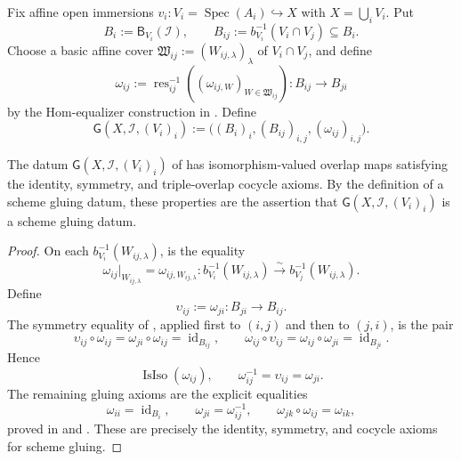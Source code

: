 \begin{definition}
  \label{def:nagata-global-blowup-glue-data}

  Fix affine open immersions
  $v_i\colon V_i=\operatorname{Spec}(A_i)\hookrightarrow X$ with
  $X=\bigcup_iV_i$.  Put
  \[
    B_i:=\mathsf B_{V_i}(\mathcal I),\qquad
    B_{ij}:=b_{V_i}^{-1}(V_i\cap V_j)\subseteq B_i.
  \]
  Choose a basic affine cover
  $\mathfrak W_{ij}:=(W_{ij,\lambda})_\lambda$ of $V_i\cap V_j$, and define
  \[
    \omega_{ij}:=
      \operatorname{res}_{ij}^{-1}
      ((\widehat\omega_{ij,W})_{W\in\mathfrak W_{ij}})
      \colon B_{ij}\longrightarrow B_{ji}
  \]
  by the Hom-equalizer construction in
  .
  Define
  \[
    \mathsf G(X,\mathcal I,(V_i)_i):=
      \bigl((B_i)_i,(B_{ij})_{i,j},(\omega_{ij})_{i,j}\bigr).
  \]
\end{definition}

\begin{lemma}
  \label{lemma:nagata-global-blowup-glue-data-valid}

  The datum $\mathsf G(X,\mathcal I,(V_i)_i)$ of
   has isomorphism-valued
  overlap maps satisfying the identity, symmetry, and triple-overlap cocycle
  axioms.  By the definition of a scheme gluing datum, these properties are
  the assertion that $\mathsf G(X,\mathcal I,(V_i)_i)$ is a scheme gluing
  datum.
\end{lemma}

\begin{proof}
  On each $b_{V_i}^{-1}(W_{ij,\lambda})$,
   is the equality
  \[
    \omega_{ij}|_{W_{ij,\lambda}}
      =\omega_{ij,W_{ij,\lambda}}\colon
      b_{V_i}^{-1}(W_{ij,\lambda})
      \xrightarrow{\sim}b_{V_j}^{-1}(W_{ij,\lambda}).
  \]
  Define
  \[
    \upsilon_{ij}:=\omega_{ji}\colon B_{ji}\longrightarrow B_{ij}.
  \]
  The symmetry equality of
  , applied first to
  $(i,j)$ and then to $(j,i)$, is the pair
  \[
    \upsilon_{ij}\circ\omega_{ij}
      =\omega_{ji}\circ\omega_{ij}=\operatorname{id}_{B_{ij}},
    \qquad
    \omega_{ij}\circ\upsilon_{ij}
      =\omega_{ij}\circ\omega_{ji}=\operatorname{id}_{B_{ji}}.
  \]
  Hence
  \[
    \operatorname{IsIso}(\omega_{ij}),\qquad
    \omega_{ij}^{-1}=\upsilon_{ij}=\omega_{ji}.
  \]
  The remaining gluing axioms are the explicit equalities
  \[
    \omega_{ii}=\operatorname{id}_{B_i},\qquad
    \omega_{ji}=\omega_{ij}^{-1},\qquad
    \omega_{jk}\circ\omega_{ij}=\omega_{ik},
  \]
  proved in  and
  .  These are precisely the
  identity, symmetry, and cocycle axioms for scheme gluing.
\end{proof}

